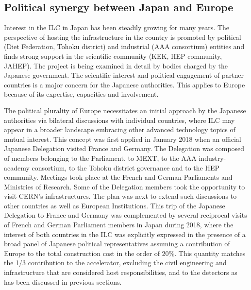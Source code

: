 \documentclass[%
 reprint,
 floatfix,
 amsmath,amssymb,
 aps,
]{revtex4-1}
\begin{document}
\subsection{\label{sec:discussionPol}Political synergy between Japan and Europe}
Interest in the ILC in Japan has been steadily growing for many years. The perspective of hosting the infrastructure in the country is promoted by political (Diet Federation, Tohoku district)
and industrial (AAA consortium) entities and finds strong support in the scientific community (KEK,
HEP community, JAHEP). The project is being examined in detail by bodies charged by the Japanese government. The scientific interest and political
engagement of partner countries is a major concern for the Japanese authorities. This
applies  to Europe because of its expertise, capacities and involvement.

The political plurality of Europe necessitates an initial approach by the Japanese
authorities via bilateral discussions with individual countries, where ILC may appear in a broader
landscape embracing other advanced technology topics of mutual interest. This concept was first applied
in January 2018 when an official Japanese Delegation visited France and Germany. The Delegation
was composed of members belonging to the Parliament, to MEXT, to the AAA industry-academy
consortium, to the Tohoku district governance and to the HEP community. Meetings took place at
the French and German Parliaments and Ministries of Research. Some of the Delegation members took the opportunity
to visit CERN's infrastructures. The plan was next to extend such discussions to other countries as well as European
Institutions. This trip of the Japanese Delegation to France and Germany was complemented by several reciprocal
visits of French and German Parliament members in Japan during 2018, where the interest of
both countries in the ILC was explicitly expressed in the presence of a broad panel of Japanese political
representatives assuming a contribution of Europe to the total construction cost in the order of 20\%. This quantity matches the 1/3 contribution to the accelerator, excluding the civil engineering and infrastructure that are considered host responsibilities, and to the detectors as has been discussed in previous sections.
\end{document}
